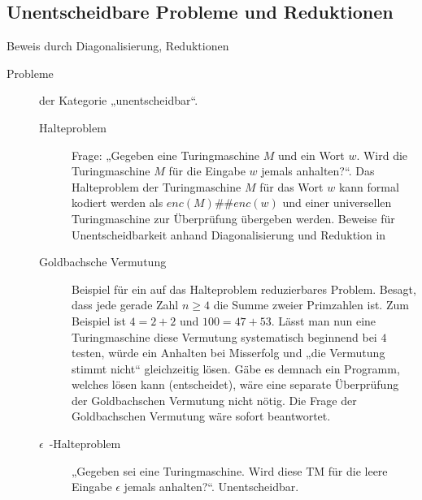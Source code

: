 \subsection{Unentscheidbare Probleme und Reduktionen}
    Beweis durch Diagonalisierung, Reduktionen 
    \begin{description}
        \item[Probleme] der Kategorie „unentscheidbar“.
        \begin{description}
            \item[Halteproblem \phalt] Frage: „Gegeben eine Turingmaschine $M$ und ein Wort $w$. Wird die Turingmaschine $M$ für die Eingabe $w$ jemals anhalten?“. Das Halteproblem \phalt der Turingmaschine $M$ für das Wort $w$ kann formal kodiert werden als $enc(M)\#\#enc(w)$ und einer universellen Turingmaschine zur Überprüfung übergeben werden. Beweise für Unentscheidbarkeit anhand Diagonalisierung und Reduktion in 

            \item[Goldbachsche Vermutung] Beispiel für ein auf das Halteproblem reduzierbares Problem. Besagt, dass jede gerade Zahl $n \ge 4$ die Summe zweier Primzahlen ist. Zum Beispiel ist $4 = 2 + 2$ und $100 = 47 + 53$. Lässt man nun eine Turingmaschine diese Vermutung systematisch beginnend bei $4$ testen, würde ein Anhalten bei Misserfolg \phalt und „die Vermutung stimmt nicht“ gleichzeitig lösen. Gäbe es demnach ein Programm, welches \phalt lösen kann (entscheidet), wäre eine separate Überprüfung der Goldbachschen Vermutung nicht nötig. Die Frage der Goldbachschen Vermutung wäre sofort beantwortet.

            \item[$\epsilon$~-Halteproblem] „Gegeben sei eine Turingmaschine. Wird diese TM für die leere Eingabe $\epsilon$ jemals anhalten?“. Unentscheidbar.
        \end{description}


\end{description}
